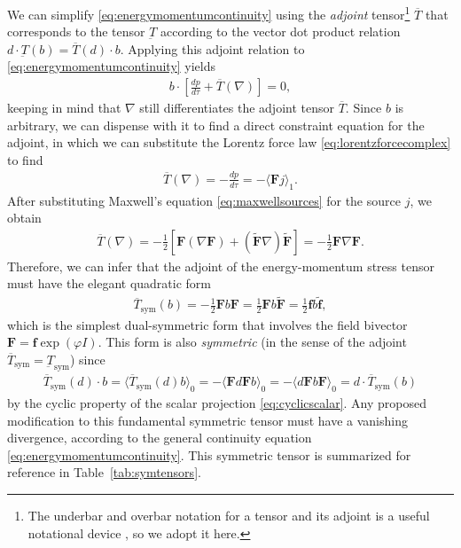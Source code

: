 \documentclass[1p,sort&compress]{elsarticle}
\numberwithin{equation}{section}
\newcommand{\bv}[1]{\mathbf{#1}}
\newcommand{\mean}[1]{\langle #1 \rangle}
\begin{document}
We can simplify \eqref{eq:energymomentumcontinuity} using the \emph{adjoint} tensor\footnote{The underbar and overbar notation for a tensor and its adjoint is a useful notational device \cite{Doran2007}, so we adopt it here.} $\overline{T}$ that corresponds to the tensor $\underbar{T}$ according to the vector dot product relation $d \cdot \underbar{T}(b) = \overline{T}(d) \cdot b$.  Applying this adjoint relation to \eqref{eq:energymomentumcontinuity} yields \cite{Doran2007}
\begin{align}
  b\cdot\left[\frac{dp}{d\tau} + \overline{T}(\nabla)\right] = 0,
\end{align}
keeping in mind that $\nabla$ still differentiates the adjoint tensor $\overline{T}$.  Since $b$ is arbitrary, we can dispense with it to find a direct constraint equation for the adjoint, in which we can substitute the Lorentz force law \eqref{eq:lorentzforcecomplex} to find
\begin{align}
  \overline{T}(\nabla) = -\frac{dp}{d\tau} = -\mean{\bv{F}j}_1.
\end{align}
After substituting Maxwell's equation \eqref{eq:maxwellsources} for the source $j$, we obtain 
\begin{align}
  \overline{T}(\nabla) = -\frac{1}{2}\left[\bv{F}(\nabla\bv{F}) + (\widetilde{\bv{F}}\nabla)\widetilde{\bv{F}}\right] = -\frac{1}{2}\bv{F}\nabla\bv{F}.
\end{align}
Therefore, we can infer that the adjoint of the energy-momentum stress tensor must have the elegant quadratic form
\begin{align}\label{eq:symemstress}
  \overline{T}_{\text{sym}}(b) = -\frac{1}{2}\bv{F}b\bv{F} = \frac{1}{2}\bv{F}b\widetilde{\bv{F}} = \frac{1}{2}\bv{f}b\widetilde{\bv{f}},
\end{align}
which is the simplest dual-symmetric form that involves the field bivector $\bv{F} = \bv{f}\exp(\varphi I)$.  This form is also \emph{symmetric} (in the sense of the adjoint $\overline{T}_{\text{sym}} = \underbar{T}_{\text{sym}}$) since 
\begin{align}
  \overline{T}_{\text{sym}}(d)\cdot b = \mean{\overline{T}_{\text{sym}}(d)b}_0 = -\mean{\bv{F}d\bv{F}b}_0 = -\mean{d\bv{F}b\bv{F}}_0 = d\cdot\overline{T}_{\text{sym}}(b)
\end{align}
by the cyclic property of the scalar projection \eqref{eq:cyclicscalar}.  Any proposed modification to this fundamental symmetric tensor must have a vanishing divergence, according to the general continuity equation \eqref{eq:energymomentumcontinuity}.  This symmetric tensor is summarized for reference in Table~\ref{tab:symtensors}.
\end{document}
